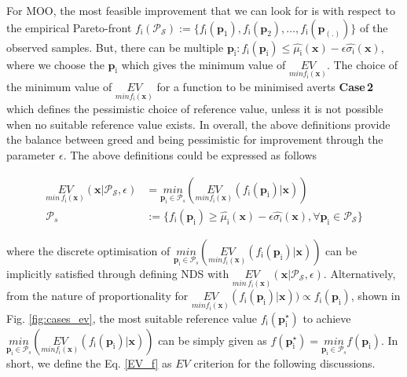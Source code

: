 For MOO, the most feasible improvement that we can look for is with respect to the empirical Pareto-front $f_{\mathsf{i}}(\mathscr{P}_{\mathcal{S}}):=\{f_{\mathsf{i}}(\bm{p}_1),f_{\mathsf{i}}(\bm{p}_2),\hdots,f_{\mathsf{i}}(\bm{p}_{(.)})\}$ of the observed samples. But, there can be multiple $\bm{p}_{\mathrm i}:f_{\mathsf i}(\bm{p}_{\mathrm{i}})\leq\hat{\mu_{\mathsf{i}}}(\bm{x})-\epsilon\hat{\sigma_{\mathsf{i}}}(\bm{x})$, where we choose the $\bm{p}_\mathrm{i}$ which gives the minimum value of $\underset{min f_{\mathsf{i}}(\bm{x})}{EV}$. The choice of the minimum value of $\underset{min f_{\mathsf{i}}(\bm{x})}{EV}$ for a function to be minimised averts \textbf{Case\,2} which defines the pessimistic choice of reference value, unless it is not possible when no suitable reference value exists. In overall, the above definitions provide the balance between greed and being pessimistic for improvement through the parameter $\epsilon$. The above definitions could be expressed as follows

\begin{equation} \label{EV_f}
\begin{split}
\underset{min\,f_{\mathsf{i}}(\bm{x})}{EV}(\bm{x}|\mathscr{P}_{\mathcal{S}},\epsilon) &= \underset{\bm{p}_{\mathrm i}\in \mathscr{P}_s}{min}(\underset{min f_{\mathsf{i}}(\bm{x})}{EV}(f_{\mathsf{i}}(\bm{p}_{\mathrm{i}})|\bm{x})) \\
\mathscr{P}_s &:=\{  f_{\mathsf{i}}(\bm{p}_{\mathrm i})\geq\hat{\mu_{\mathsf{i}}}(\bm{x})-\epsilon\hat{\sigma_{\mathsf{i}}}(\bm{x}),\forall\bm{p}_{\mathrm i}\in\mathscr{P}_{\mathcal{S}}\}
\end{split}
\end{equation}

where the discrete optimisation of $\underset{\bm{p}_{\mathrm i}\in \mathscr{P}_s}{min}(\underset{min f_{\mathsf{i}}(\bm{x})}{EV}(f_{\mathsf{i}}(\bm{p}_{\mathrm i})|\bm{x}))$ can be implicitly satisfied through defining NDS with $\underset{min\,f_{\mathsf{i}}(\bm{x})}{EV}(\bm{x}|\mathscr{P}_{\mathcal{S}},\epsilon)$. 
Alternatively, from the nature of proportionality for $\underset{min f_{\mathsf{i}}(\bm{x})}{EV}(f_{\mathsf{i}}(\bm{p}_{\mathrm{i}})|\bm{x})) \propto f_{\mathsf{i}}(\bm{p}_{\mathrm i})$, shown in Fig. \ref{fig:cases_ev}, the most suitable reference value $f_{\mathsf{i}}(\bm{p}_{\mathrm i}^\star)$ to achieve $\underset{\bm{p}_{\mathrm i} \in \mathscr{P}_s}{min}(\underset{min f_{\mathsf{i}}(\bm{x})}{EV}(f_{\mathsf{i}}(\bm{p}_{\mathrm i})|\bm{x}))$ can be simply given as  $f(\bm{p}_{\mathrm i}^\star)=\underset{\bm{p}_{\mathrm i}\in \mathscr{P}_s}{min} f(\bm{p}_{\mathrm i})$.  In short, we define the Eq. \eqref{EV_f} as $EV$ criterion for the following discussions.\\

